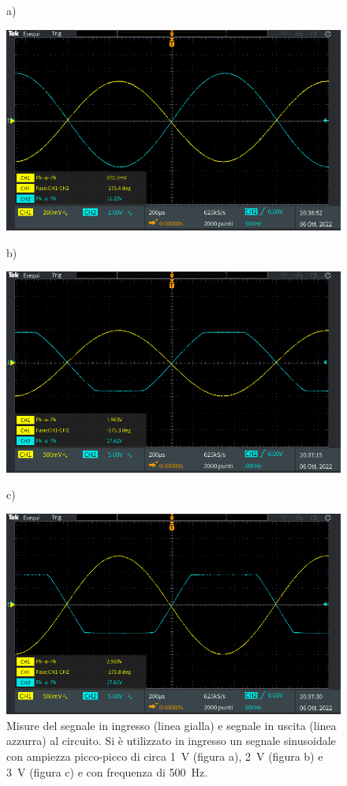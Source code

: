 \begin{figure}[h!]
	\centering
	a)
	
	\includegraphics[width=0.8\linewidth]{./ImageFiles/Laboratorio 1/TEK00008}	
\end{figure}
\begin{figure}[h!]
	\centering
	b)
	
	\includegraphics[width=0.8\linewidth]{./ImageFiles/Laboratorio 1/TEK00009}
\end{figure}
\begin{figure}[h!]
	\centering
	c)
	
	\includegraphics[width=0.8\linewidth]{./ImageFiles/Laboratorio 1/TEK00010}
	\caption{Misure del segnale in ingresso (linea gialla) e segnale in uscita (linea azzurra) al circuito. Si è utilizzato in ingresso un segnale sinusoidale con ampiezza picco-picco di circa \SI{1}{\volt} (figura a), \SI{2}{\volt} (figura b) e \SI{3}{\volt} (figura c) e con frequenza di \SI{500}{\hertz}.}
	\label{fig:misure_oscilloscopio_sat}
\end{figure} 

